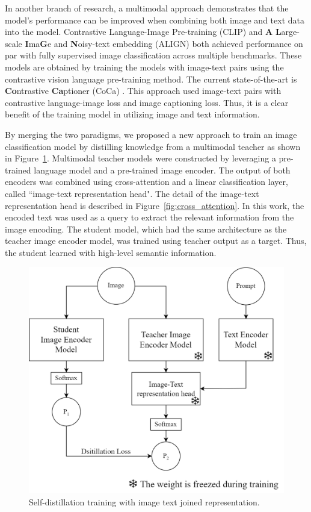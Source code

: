 \documentclass[10pt,twocolumn,letterpaper]{article}
\begin{document}
In another branch of research, a multimodal approach demonstrates that the model's performance can be improved when combining both image and text data into the model.
Contrastive Language-Image Pre-training (CLIP) \cite{radford2021learning} and \textbf{A} \textbf{L}arge-scale \textbf{I}ma\textbf{G}e and \textbf{N}oisy-text embedding (ALIGN) \cite{jia2021scaling} both achieved performance on par with fully supervised image classification across multiple benchmarks.
These models are obtained by training the models with image-text pairs using the contrastive vision language pre-training method.
The current state-of-the-art is \textbf{Co}ntrastive \textbf{Ca}ptioner (CoCa) \cite{yu2022coca}.
This approach used image-text pairs with contrastive language-image loss and image captioning loss.
Thus, it is a clear benefit of the training model in utilizing image and text information.

By merging the two paradigms, we proposed a new approach to train an image classification model by distilling knowledge from a multimodal teacher as shown in Figure~\ref{fig:overall_method}.
Multimodal teacher models were constructed by leveraging a pre-trained language model and a pre-trained image encoder.
The output of both encoders was combined using cross-attention and a linear classification layer, called ``image-text representation head".
The detail of the image-text representation head is described in Figure~\ref{fig:cross_attention}.
In this work, the encoded text was used as a query to extract the relevant information from the image encoding.
The student model, which had the same architecture as the teacher image encoder model, was trained using teacher output as a target.
Thus, the student learned with high-level semantic information.

\begin{figure}[h]
   \label{fig:overall_method}
   \begin{center}
      \includegraphics[width=0.8\linewidth]{Images/OverviewMethod.png}
   \end{center}
   \caption{Self-distillation training with image text joined representation.}
   \small
\end{figure}
\end{document}
